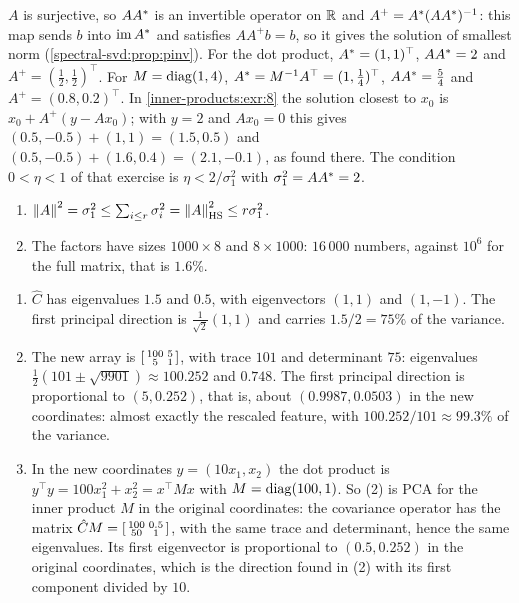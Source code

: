 $A$ is surjective, so $AA^{*}$ is an invertible operator on $\mathbb{R}$ and
$A^+ = A^{*}(AA^{*})^{-1}$: this map sends $b$ into $\operatorname{im}A^{*}$ and
satisfies $AA^+b = b$, so it gives the solution of smallest norm
(\cref{spectral-svd:prop:pinv}). For the dot product,
$A^{*} = (1, 1)^\top$, $AA^{*} = 2$ and $A^+ = (\frac12, \frac12)^\top$.
For $M = \operatorname{diag}(1, 4)$, $A^{*} = M^{-1}A^\top = (1, \frac14)^\top$,
$AA^{*} = \frac54$ and $A^+ = (0.8, 0.2)^\top$. In
\cref{inner-products:exr:8} the solution closest to $x_0$ is
$x_0 + A^+(y - Ax_0)$; with $y = 2$ and $Ax_0 = 0$ this gives
$(0.5, -0.5) + (1, 1) = (1.5, 0.5)$ and
$(0.5, -0.5) + (1.6, 0.4) = (2.1, -0.1)$, as found there. The condition
$0 < \eta < 1$ of that exercise is $\eta < 2/\sigma_1^2$ with
$\sigma_1^2 = AA^{*} = 2$.

\begin{enumerate}[nosep]
  \item $\left\|A\right\|^2 = \sigma_1^2\leq\sum_{i\leq r}\sigma_i^2
        = \left\|A\right\|_{\mathrm{HS}}^2\leq r\sigma_1^2$.
  \item The factors have sizes $1000\times8$ and $8\times1000$:
        $16\,000$ numbers, against $10^6$ for the full matrix, that is
        $1.6\%$.
\end{enumerate}

\begin{enumerate}[nosep]
  \item $\hat C$ has eigenvalues $1.5$ and $0.5$, with eigenvectors
        $(1, 1)$ and $(1, -1)$. The first principal direction is
        $\frac1{\sqrt2}(1, 1)$ and carries $1.5/2 = 75\%$ of the variance.
  \item The new array is
        $\begin{bsmallmatrix}100 & 5\\5 & 1\end{bsmallmatrix}$, with trace
        $101$ and determinant $75$: eigenvalues
        $\frac12(101\pm\sqrt{9901})\approx100.252$ and $0.748$. The first
        principal direction is proportional to $(5, 0.252)$, that is,
        about $(0.9987, 0.0503)$ in the new coordinates: almost exactly
        the rescaled feature, with $100.252/101\approx99.3\%$ of the
        variance.
  \item In the new coordinates $y = (10x_1, x_2)$ the dot product is
        $y^\top y = 100x_1^2 + x_2^2 = x^\top Mx$ with
        $M = \operatorname{diag}(100, 1)$. So (2) is PCA for the inner product $M$ in
        the original coordinates: the covariance operator has the matrix
        $\hat CM = \begin{bsmallmatrix}100 & 0.5\\50 & 1\end{bsmallmatrix}$,
        with the same trace and determinant, hence the same eigenvalues.
        Its first eigenvector is proportional to $(0.5, 0.252)$ in the
        original coordinates, which is the direction found in (2) with
        its first component divided by $10$.
\end{enumerate}

